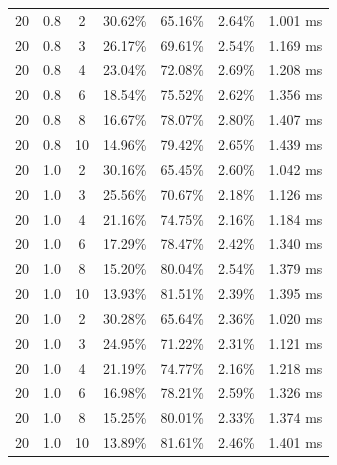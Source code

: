 \documentclass[11pt,a4paper]{article}
\begin{document}
\begin{longtable}{ccccccc}
        20 & 0.8 & 2 & 30.62\% & 65.16\% & 2.64\% & 1.001 ms \\
        20 & 0.8 & 3 & 26.17\% & 69.61\% & 2.54\% & 1.169 ms \\
        20 & 0.8 & 4 & 23.04\% & 72.08\% & 2.69\% & 1.208 ms \\
        20 & 0.8 & 6 & 18.54\% & 75.52\% & 2.62\% & 1.356 ms \\
        20 & 0.8 & 8 & 16.67\% & 78.07\% & 2.80\% & 1.407 ms \\
        20 & 0.8 & 10 & 14.96\% & 79.42\% & 2.65\% & 1.439 ms \\
        \midrule
        20 & 1.0 & 2 & 30.16\% & 65.45\% & 2.60\% & 1.042 ms \\
        20 & 1.0 & 3 & 25.56\% & 70.67\% & 2.18\% & 1.126 ms \\
        20 & 1.0 & 4 & 21.16\% & 74.75\% & 2.16\% & 1.184 ms \\
        20 & 1.0 & 6 & 17.29\% & 78.47\% & 2.42\% & 1.340 ms \\
        20 & 1.0 & 8 & 15.20\% & 80.04\% & 2.54\% & 1.379 ms \\
        20 & 1.0 & 10 & 13.93\% & 81.51\% & 2.39\% & 1.395 ms \\
        20 & 1.0 & 2 & 30.28\% & 65.64\% & 2.36\% & 1.020 ms \\
        20 & 1.0 & 3 & 24.95\% & 71.22\% & 2.31\% & 1.121 ms \\
        20 & 1.0 & 4 & 21.19\% & 74.77\% & 2.16\% & 1.218 ms \\
        20 & 1.0 & 6 & 16.98\% & 78.21\% & 2.59\% & 1.326 ms \\
        20 & 1.0 & 8 & 15.25\% & 80.01\% & 2.33\% & 1.374 ms \\
        20 & 1.0 & 10 & 13.89\% & 81.61\% & 2.46\% & 1.401 ms \\
\end{longtable}
\end{document}
